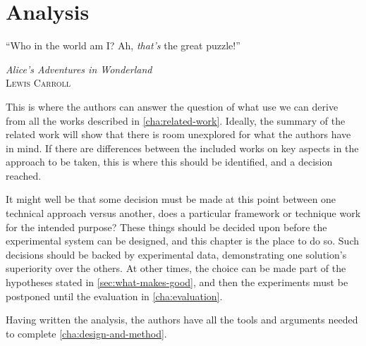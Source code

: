 \chapter{Analysis}
\label{cha:analysis}
\epigraph{``Who in the world am I? Ah, \textit{that’s} the great puzzle!''}{\textit{Alice’s Adventures in Wonderland}\\\textsc{Lewis Carroll}}

This is where the authors can answer the question of what use we can derive
from all the works described in \autoref{cha:related-work}. Ideally, the
summary of the related work will show that there is room unexplored for what
the authors have in mind. If there are differences between the included
works on key aspects in the approach to be taken, this is where this should
be identified, and a decision reached.

It might well be that some decision must be made at this point between one
technical approach versus another, \eg does a particular framework or
technique work for the intended purpose?  These things should be decided
upon before the experimental system can be designed, and this chapter is the
place to do so. Such decisions should be backed by experimental data,
demonstrating one solution's superiority over the others. At other times,
the choice can be made part of the hypotheses stated in
\autoref{sec:what-makes-good}, and then the experiments must be postponed
until the evaluation in \autoref{cha:evaluation}.

Having written the analysis, the authors have all the tools and arguments
needed to complete \autoref{cha:design-and-method}.



